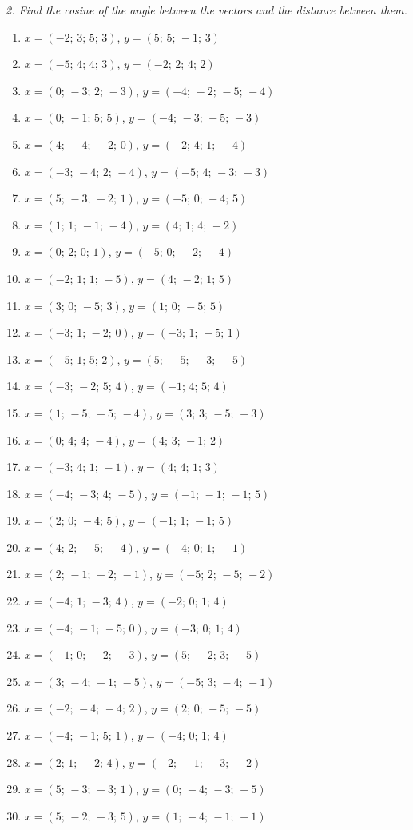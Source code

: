 \emph{2. Find the cosine of the angle between the vectors and the distance between them.}
\bigskip
\begin{enumerate}[label=\arabic*., leftmargin=*]
\item $x=(-2;\,3;\,5;\,3)$, $y=(5;\,5;\,-1;\,3)$
\item $x=(-5;\,4;\,4;\,3)$, $y=(-2;\,2;\,4;\,2)$
\item $x=(0;\,-3;\,2;\,-3)$, $y=(-4;\,-2;\,-5;\,-4)$
\item $x=(0;\,-1;\,5;\,5)$, $y=(-4;\,-3;\,-5;\,-3)$
\item $x=(4;\,-4;\,-2;\,0)$, $y=(-2;\,4;\,1;\,-4)$
\item $x=(-3;\,-4;\,2;\,-4)$, $y=(-5;\,4;\,-3;\,-3)$
\item $x=(5;\,-3;\,-2;\,1)$, $y=(-5;\,0;\,-4;\,5)$
\item $x=(1;\,1;\,-1;\,-4)$, $y=(4;\,1;\,4;\,-2)$
\item $x=(0;\,2;\,0;\,1)$, $y=(-5;\,0;\,-2;\,-4)$
\item $x=(-2;\,1;\,1;\,-5)$, $y=(4;\,-2;\,1;\,5)$
\item $x=(3;\,0;\,-5;\,3)$, $y=(1;\,0;\,-5;\,5)$
\item $x=(-3;\,1;\,-2;\,0)$, $y=(-3;\,1;\,-5;\,1)$
\item $x=(-5;\,1;\,5;\,2)$, $y=(5;\,-5;\,-3;\,-5)$
\item $x=(-3;\,-2;\,5;\,4)$, $y=(-1;\,4;\,5;\,4)$
\item $x=(1;\,-5;\,-5;\,-4)$, $y=(3;\,3;\,-5;\,-3)$
\item $x=(0;\,4;\,4;\,-4)$, $y=(4;\,3;\,-1;\,2)$
\item $x=(-3;\,4;\,1;\,-1)$, $y=(4;\,4;\,1;\,3)$
\item $x=(-4;\,-3;\,4;\,-5)$, $y=(-1;\,-1;\,-1;\,5)$
\item $x=(2;\,0;\,-4;\,5)$, $y=(-1;\,1;\,-1;\,5)$
\item $x=(4;\,2;\,-5;\,-4)$, $y=(-4;\,0;\,1;\,-1)$
\item $x=(2;\,-1;\,-2;\,-1)$, $y=(-5;\,2;\,-5;\,-2)$
\item $x=(-4;\,1;\,-3;\,4)$, $y=(-2;\,0;\,1;\,4)$
\item $x=(-4;\,-1;\,-5;\,0)$, $y=(-3;\,0;\,1;\,4)$
\item $x=(-1;\,0;\,-2;\,-3)$, $y=(5;\,-2;\,3;\,-5)$
\item $x=(3;\,-4;\,-1;\,-5)$, $y=(-5;\,3;\,-4;\,-1)$
\item $x=(-2;\,-4;\,-4;\,2)$, $y=(2;\,0;\,-5;\,-5)$
\item $x=(-4;\,-1;\,5;\,1)$, $y=(-4;\,0;\,1;\,4)$
\item $x=(2;\,1;\,-2;\,4)$, $y=(-2;\,-1;\,-3;\,-2)$
\item $x=(5;\,-3;\,-3;\,1)$, $y=(0;\,-4;\,-3;\,-5)$
\item $x=(5;\,-2;\,-3;\,5)$, $y=(1;\,-4;\,-1;\,-1)$
\end{enumerate}

